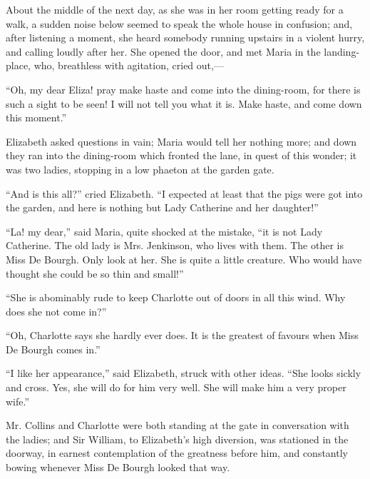 About the middle of the next day, as she was in her room getting ready for a walk, a sudden noise below seemed to speak the whole house in confusion; and, after listening a moment, she heard somebody running upstairs in a violent hurry, and calling loudly after her. She opened the door, and met Maria in the landing-place, who, breathless with agitation, cried out,---



``Oh, my dear Eliza! pray make haste and come into the dining-room, for there is such a sight to be seen! I will not tell you what it is. Make haste, and come down this moment.''

Elizabeth asked questions in vain; Maria would tell her nothing more; and down they ran into the dining-room which fronted the lane, in quest of this wonder; it was two ladies, stopping in a low phaeton at the garden gate.

``And is this all?'' cried Elizabeth. ``I expected at least that the pigs were got into the garden, and here is nothing but Lady Catherine and her daughter!''

``La! my dear,'' said Maria, quite shocked at the mistake, ``it is not Lady Catherine. The old lady is Mrs. Jenkinson, who lives with them. The other is Miss De Bourgh. Only look at her. She is quite a little creature. Who would have thought she could be so thin and small!''

``She is abominably rude to keep Charlotte out of doors in all this wind. Why does she not come in?''

``Oh, Charlotte says she hardly ever does. It is the greatest of favours when Miss De Bourgh comes in.''

``I like her appearance,'' said Elizabeth, struck with other ideas. ``She looks sickly and cross. Yes, she will do for him very well. She will make him a very proper wife.''

Mr. Collins and Charlotte were both standing at the gate in conversation with the ladies; and Sir William, to Elizabeth's high diversion, was stationed in the doorway, in earnest contemplation of the greatness before him, and constantly bowing whenever Miss De Bourgh looked that way.

